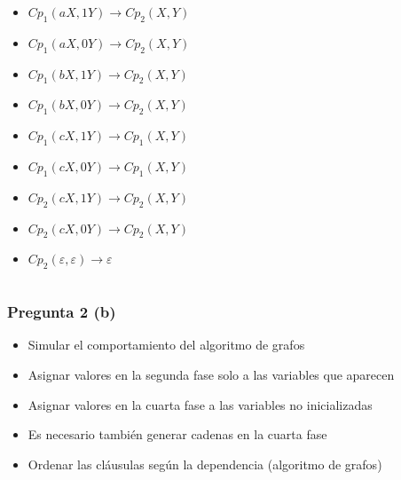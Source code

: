 \documentclass{beamer}
\begin{document}
\begin{frame}
\begin{columns}
\begin{column}{0.5\textwidth}
\begin{itemize}
                \item $Cp_1(aX,1Y) \to Cp_2(X,Y)$
                \item $Cp_1(aX,0Y) \to Cp_2(X,Y)$
                \item $Cp_1(bX,1Y) \to Cp_2(X,Y)$
                \item $Cp_1(bX,0Y) \to Cp_2(X,Y)$
                \item $Cp_1(cX,1Y) \to Cp_1(X,Y)$
                \item $Cp_1(cX,0Y) \to Cp_1(X,Y)$
                \item $Cp_2(cX,1Y) \to Cp_2(X,Y)$
                \item $Cp_2(cX,0Y) \to Cp_2(X,Y)$
                \item $Cp_2(\varepsilon,\varepsilon)\to \varepsilon$
            \end{itemize}
        \end{column}
    \end{columns}
\end{frame}

\begin{frame}
    \frametitle{Pregunta 2 (b)}
    
    \begin{itemize}
        \item Simular el comportamiento del algoritmo de grafos
              \pause
        \item Asignar valores en la segunda fase solo a las variables que aparecen
              \pause
        \item Asignar valores en la cuarta fase a las variables no inicializadas
              \pause
        \item Es necesario también generar cadenas en la cuarta fase
              \pause
        \item Ordenar las cláusulas según la dependencia (algoritmo de grafos)
    \end{itemize}
    
\end{frame}
\end{document}
